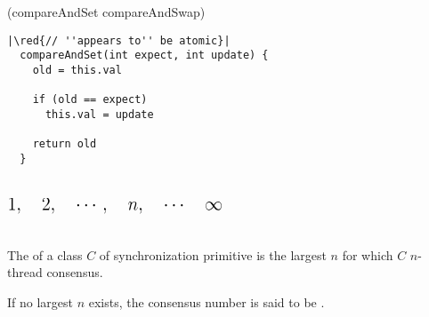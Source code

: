 \begin{frame}[fragile]{}
  \centerline{\textsf{(compareAndSet \quad compareAndSwap)}}

  \pause
  \vspace{0.50cm}
  \begin{lstlisting}[style = Cstyle]
  |\red{// ''appears to'' be atomic}|
  compareAndSet(int expect, int update) { 
    old = this.val
  
    if (old == expect)
      this.val = update
    
    return old
  }
  \end{lstlisting}
\end{frame}

\begin{frame}{}

  \centerline{\Large {}}
\end{frame}

\begin{frame}{}

  \centerline{\Large {} }
  
  \pause
  \vspace{0.40cm}
  \begin{columns}
      \[
	\text{\Large $1, \quad 2, \quad \cdots, \quad n, \quad \cdots \quad \infty$}
      \]
  \end{columns}
\end{frame}

\begin{frame}{}
  \begin{definition}
    The  of a class $C$ of synchronization primitive 
    is the largest $n$ for which $C$  $n$-thread consensus.

    \vspace{0.30cm}
    If no largest $n$ exists, the consensus number is said to be .
  \end{definition}
\end{frame}

